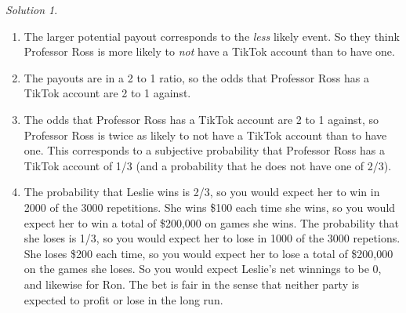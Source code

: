 \documentclass[
  letterpaper,
  DIV=11,
  numbers=noendperiod]{scrreprt}
\providecommand{\tightlist}{%
  \setlength{\itemsep}{0pt}\setlength{\parskip}{0pt}}
\theoremstyle{plain}
\theoremstyle{definition}
\theoremstyle{definition}
\theoremstyle{definition}
\theoremstyle{remark}
\newtheorem{refsolution}{Solution}[chapter]
\begin{document}
\begin{tcolorbox}[enhanced jigsaw, opacityback=0, rightrule=.15mm, coltitle=black, colframe=quarto-callout-tip-color-frame, toprule=.15mm, colbacktitle=quarto-callout-tip-color!10!white, opacitybacktitle=0.6, left=2mm, toptitle=1mm, breakable, title={Solution (click to expand)}, bottomtitle=1mm, colback=white, leftrule=.75mm, titlerule=0mm, arc=.35mm, bottomrule=.15mm]

\begin{refsolution}
\leavevmode

\begin{enumerate}
\def\labelenumi{\arabic{enumi}.}
\tightlist
\item
  The larger potential payout corresponds to the \emph{less} likely
  event. So they think Professor Ross is more likely to \emph{not} have
  a TikTok account than to have one.
\item
  The payouts are in a 2 to 1 ratio, so the odds that Professor Ross has
  a TikTok account are 2 to 1 against.
\item
  The odds that Professor Ross has a TikTok account are 2 to 1 against,
  so Professor Ross is twice as likely to not have a TikTok account than
  to have one. This corresponds to a subjective
  probability\footnotemark{} that Professor Ross has a TikTok account of
  1/3 (and a probability that he does not have one of 2/3).
\item
  The probability that Leslie wins is 2/3, so you would expect her to
  win in 2000 of the 3000 repetitions. She wins \$100 each time she
  wins, so you would expect her to win a total of \$200,000 on games she
  wins. The probability that she loses is 1/3, so you would expect her
  to lose in 1000 of the 3000 repetions. She loses \$200 each time, so
  you would expect her to lose a total of \$200,000 on the games she
  loses. So you would expect Leslie's net winnings to be 0, and likewise
  for Ron. The bet is fair in the sense that neither party is expected
  to profit or lose in the long run.
\end{enumerate}


\end{refsolution}
\end{tcolorbox}
\end{document}
